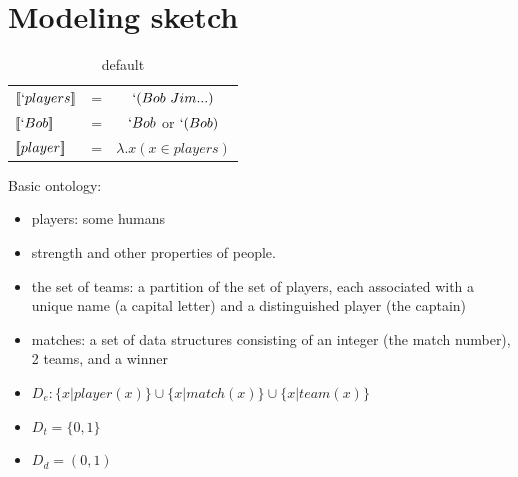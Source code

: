 \documentclass[12pt]{article}
\newcommand{\llbracket}{\ensuremath{\left [\!\left [}}%
\newcommand{\rrbracket}{\ensuremath{\right ]\!\right ]}}
\providecommand{\sv}[1]{\ensuremath{\llbracket #1 \rrbracket}}
\begin{document}
\section{Modeling sketch}

\begin{table}[htdp]
\caption{default}
\begin{center}
\begin{tabular}{llc}
\sv{`players}&= & $`(Bob\ Jim ...)$ \\
\sv{`Bob}&= & $`Bob$ or $`(Bob)$ \\
\sv{player}&= & $\lambda.x (x\in players) $ \\
 
\end{tabular}
\end{center}
\label{default}
\end{table}%



\noindent Basic ontology: 
\begin{itemize}
\item players: some humans
\item strength and other properties of people.
\item the set of teams: a partition of the set of players, each associated with a unique name (a capital letter) and a distinguished player (the captain)
\item matches: a set of data structures consisting of an integer (the match number), 2 teams, and a winner
\item $D_e: \{x|\mathit{player}(x)\} \cup \{x|\mathit{match}(x)\} \cup \{x|\mathit{team}(x)\}$
\item $D_t = \{0,1\}$
\item $D_d = (0,1)$
\end{itemize}
\end{document}
